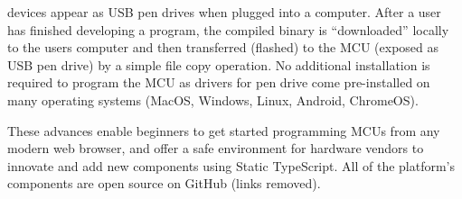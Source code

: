 
\MC devices appear as USB pen drives when plugged into a computer. After a user has finished developing a program, the compiled binary is ``downloaded'' locally to the users computer and then transferred (flashed) to the MCU (exposed as USB pen drive) by a simple file copy operation. No additional installation is required to program the MCU as drivers for pen drive come pre-installed on many operating systems (MacOS, Windows, Linux, Android, ChromeOS).

These advances enable beginners to get started programming MCUs from any modern web browser, and offer a safe environment for hardware vendors to innovate and add new components using Static TypeScript. All of the platform's components are open source on GitHub (links removed).